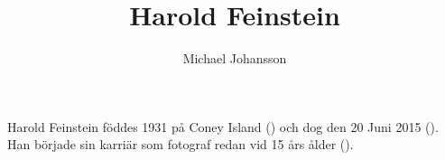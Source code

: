 \documentclass{article}
\author{Michael Johansson}
\title{Harold Feinstein}
\begin{document}
\maketitle
\newpage

Harold Feinstein föddes 1931 på Coney Island (\textcite{harsite18}) och dog den 20 Juni 2015 (\textcite{harwiki18}).
Han började sin karriär som fotograf redan vid 15 års ålder (\textcite{harsite18}).

\newpage
\printbibliography{}
\end{document}
